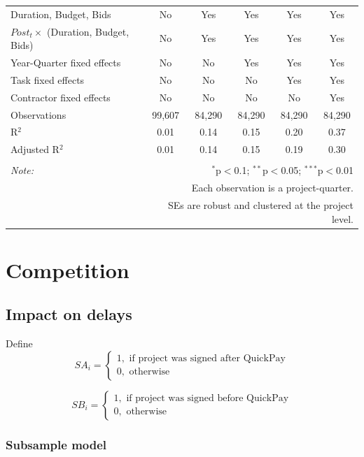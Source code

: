 \documentclass[
]{article}
\begin{document}
\begin{table}[H]
\begin{tabular}{@{\extracolsep{-2pt}}lccccc}
Duration, Budget, Bids & No & Yes & Yes & Yes & Yes \\ 
$Post_t \times $  (Duration, Budget, Bids) & No & Yes & Yes & Yes & Yes \\ 
Year-Quarter fixed effects & No & No & Yes & Yes & Yes \\ 
Task fixed effects & No & No & No & Yes & Yes \\ 
Contractor fixed effects & No & No & No & No & Yes \\ 
Observations & 99,607 & 84,290 & 84,290 & 84,290 & 84,290 \\ 
R$^{2}$ & 0.01 & 0.14 & 0.15 & 0.20 & 0.37 \\ 
Adjusted R$^{2}$ & 0.01 & 0.14 & 0.15 & 0.19 & 0.30 \\ 
\hline 
\hline \\[-1.8ex] 
\textit{Note:}  & \multicolumn{5}{r}{$^{*}$p$<$0.1; $^{**}$p$<$0.05; $^{***}$p$<$0.01} \\ 
 & \multicolumn{5}{r}{Each observation is a project-quarter.} \\ 
 & \multicolumn{5}{r}{SEs are robust and clustered at the project level.} \\ 
\end{tabular} 
\end{table}

\hypertarget{competition}{%
\section{Competition}\label{competition}}

\hypertarget{impact-on-delays}{%
\subsection{Impact on delays}\label{impact-on-delays}}

Define
\[ SA_i = \begin{cases} 1, \text{ if project was signed after QuickPay}\\
0, \text{ otherwise} \end{cases}\]

\[ SB_i = \begin{cases} 1, \text{ if project was signed before QuickPay}\\
0, \text{ otherwise} \end{cases}\]

\hypertarget{subsample-model}{%
\subsubsection{Subsample model}\label{subsample-model}}
\end{document}

